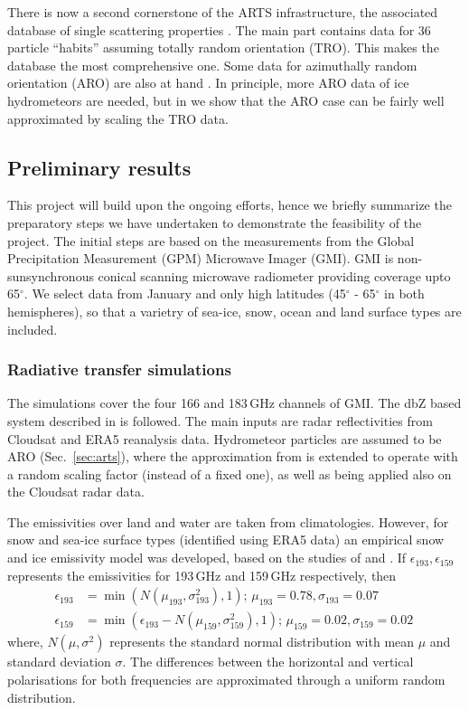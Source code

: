 \documentclass[12pt,oneside,a4paper]{article}
\begin{document}
There is now a second cornerstone of the ARTS infrastructure, the associated
database of single scattering properties \citep{eriksson:agene:18}. The main
part contains data for 36 particle ``habits'' assuming totally random
orientation (TRO). This makes the database the most comprehensive one. Some
data for azimuthally random orientation (ARO) are also at hand
\citep{brath:micro:20}. In principle, more ARO data of ice hydrometeors are
needed, but in \citet{barlakas:intro:21} we show that the ARO case can be
fairly well approximated by scaling the TRO data.

\subsection{Preliminary results}
%
This project will build upon the ongoing efforts, hence we briefly summarize
the preparatory steps we have undertaken to demonstrate the feasibility of the
project. The initial steps are based on the measurements from the Global
Precipitation Measurement (GPM) Microwave Imager (GMI). GMI is
non-sunsynchronous conical scanning microwave radiometer providing coverage
upto 65$^{\circ}$. We select data from January and only high latitudes
(45$^{\circ}$ - 65$^{\circ}$ in both hemispheres), so that a varietry of
sea-ice, snow, ocean and land surface types are included.

\subsubsection{Radiative transfer simulations}
%
\label{sec:radiative_transfer}
The simulations cover the four 166 and 183\,GHz channels of GMI. The dbZ based
system described in \citet{ekelund:using:20} is followed. The
main inputs are radar reflectivities from Cloudsat and ERA5 reanalysis data.
Hydrometeor particles are assumed to be ARO (Sec.~\ref{sec:arts}), where the
approximation from \citet{barlakas:intro:21} is extended to operate with 
a random scaling factor (instead of a fixed one), as well as being applied also
on the Cloudsat radar data.

The emissivities over land and water are taken from climatologies. However, for
snow and sea-ice surface types (identified using ERA5 data) an empirical snow
and ice emissivity model was developed, based on the studies of
\citet{harlow:2009:milli} and \citet{hewison:2002:airbo}. If
$\epsilon_{193}, \epsilon_{159}$ represents the emissivities for 193\,GHz and
159\,GHz respectively, then
\begin{align}
\epsilon_{193}& = \min({N(\mu_{193}, \sigma_{193}^{2}), 1});\, \mu_{193} = 0.78, \sigma_{193} = 0.07 \label{eq:1}\\
\epsilon_{159}& = \min(\epsilon_{193} - N(\mu_{159}, \sigma_{159}^{2}), 1) ;\,  \mu_{159} = 0.02, \sigma_{159} = 0.02\,\label{eq:2}
\end{align}
where, $N(\mu, \sigma^{2})$ represents the standard normal distribution with
mean $\mu$ and standard deviation $\sigma$. The differences between the
horizontal and vertical polarisations for both frequencies are 
approximated through a uniform random distribution.
\end{document}
